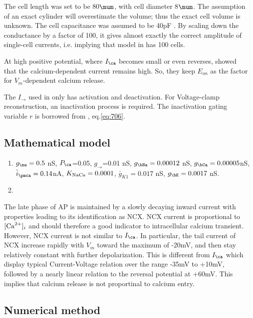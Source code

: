 The cell length was set to be 80$\mum$, with cell diameter 8$\mum$. The
assumption of an exact cylinder will overestimate the volume; thus the exact
cell volume is unknown. The cell capacitance was assumed to be 40pF
\citep{earm1990icg}. By scaling down the conductance by a factor of 100, it
gives almost exactly the correct amplitude of single-cell currents, i.e.
implying that model in \citep{hilgemann1987} has 100 cells.

At high positive potential, where $I_\ca$ becomes small or even reverses,
\citep{earm1990icg} showed that the calcium-dependent current remains high. So,
they keep $E_{on}$ as the factor for $V_m$-dependent calcium release. 

The $I_\to$ used in \citep{hilgemann1987} only has activation and deactivation.
For Voltage-clamp reconstruction, an inactivation process is required. The
inactivation gating variable $r$ is borrowed from
\citep{difrancesco1985mcea}, eq.\ref{eq:706}.

\subsection{Mathematical model}

\begin{enumerate}
  \item $g_\na=0.5$ nS, $P_\ca$=0.05, $g_\to$=0.01 nS, $g_\bNa=0.00012$ nS,
  $g_\bCa=0.00005$nS, $\bar{i}_\pmca=0.14$nA, $K_{\text{NaCa}}=0.0001$,
  $\bar{g}_{K1}=0.017$ nS, $g_\bK = 0.0017$ nS.
  \item 
\end{enumerate}
 

 
The late phase of AP is maintained by a slowly decaying inward current with
properties leading to its identification as NCX. NCX current is proportional to
$[{\text{Ca}^{2+}}]_i$ and should therefore a good indicator to intracellular calcium
transient. However, NCX current is not similar to $I_\ca$. In particular, the
tail current of NCX increase rapidly with $V_m$ toward the maximum of -20mV, and
then stay relatively constant with further depolarization. This is different
from $I_\ca$ which display typical Current-Voltage relation over the range -35mV
to +10mV, followed by a nearly linear relation to the reversal potential at
+60mV. This implies that calcium release is not proportinal to calcium entry.

\subsection{Numerical method}

